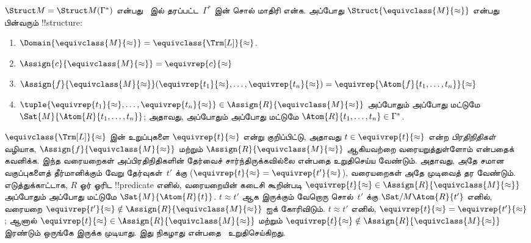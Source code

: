 \documentclass[../../../include/open-logic-section]{subfiles}
\begin{document}
\begin{defn}
$\Struct M = \Struct M(\Gamma^*)$ என்பது~ இல்
தரப்பட்ட~$\Gamma^*$ இன் சொல் மாதிரி என்க. அப்போது
$\Struct{\equivclass{M}{\approx}}$ என்பது பின்வரும் !!{structure}:
\begin{enumerate}
\item $\Domain{\equivclass{M}{\approx}} = \equivclass{\Trm[L]}{\approx}$.
\item $\Assign{c}{\equivclass{M}{\approx}} = \equivrep{c}{\approx}$
\item $\Assign{f}{\equivclass{M}{\approx}}(\equivrep{t_1}{\approx}, \dots,
  \equivrep{t_n}{\approx}) = \equivrep{\Atom{f}{t_1,\dots, t_n}}{\approx}$
\item $\tuple{\equivrep{t_1}{\approx}, \dots, \equivrep{t_n}{\approx}} \in
  \Assign{R}{\equivclass{M}{\approx}}$ அப்போதும் அப்போது மட்டுமே
  $\Sat{M}{\Atom{R}{t_1,\dots, t_n}}$; அதாவது, அப்போதும் அப்போது மட்டுமே
  $\Atom{R}{t_1,\dots, t_n} \in \Gamma^*$.
\end{enumerate}
\end{defn}

\begin{explain}
$\equivclass{\Trm[L]}{\approx}$ இன் உறுப்புகளை
$\equivrep{t}{\approx}$ என்று குறிப்பிட்டு, அதாவது
$t \in \equivrep{t}{\approx}$ என்ற \emph{பிரதிநிதிகள்} வழியாக,
$\Assign{f}{\equivclass{M}{\approx}}$ மற்றும்
$\Assign{R}{\equivclass{M}{\approx}}$ ஆகியவற்றை வரையறுத்துள்ளோம் என்பதைக்
கவனிக்க. இந்த வரையறைகள் அப்பிரதிநிதிகளின் தேர்வைச் சார்ந்திருக்கவில்லை
என்பதை உறுதிசெய்ய வேண்டும். அதாவது, அதே சமான வகுப்புகளைத் தீர்மானிக்கும்
வேறு தேர்வுகள்~$t'$ க்கு
($\equivrep{t}{\approx} = \equivrep{t'}{\approx}$), வரையறைகள் அதே முடிவைத்
தர வேண்டும். எடுத்துக்காட்டாக, $R$ ஓர் ஓரிட !!{predicate} எனில், வரையறையின்
கடைசி கூறின்படி $\equivrep{t}{\approx} \in
\Assign{R}{\equivclass{M}{\approx}}$ அப்போதும் அப்போது மட்டுமே
$\Sat{M}{\Atom{R}{t}}$. $t \approx t'$ ஆக இருக்கும் வேறொரு சொல்~$t'$ க்கு
$\Sat/{M}{\Atom{R}{t'}}$ எனில், வரையறை
$\equivrep{t'}{\approx} \notin \Assign{R}{\equivclass{M}{\approx}}$ ஐக்
கோரிவிடும். $t \approx t'$ எனில், $\equivrep{t}{\approx} =
\equivrep{t'}{\approx}$; ஆனால் $\equivrep{t}{\approx} \in
\Assign{R}{\equivclass{M}{\approx}}$ மற்றும் $\equivrep{t}{\approx}
\notin \Assign{R}{\equivclass{M}{\approx}}$ இரண்டும் ஒருங்கே இருக்க முடியாது.
இது நிகழாது என்பதை~ உறுதிசெய்கிறது.
\end{explain}
\end{document}
